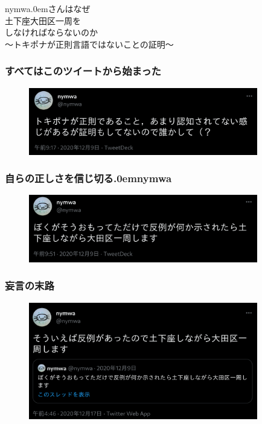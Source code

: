 \documentclass[14pt]{beamer}
\theoremstyle{definition}
\begin{document}
\begin{frame}
	\begin{center}
		{\LARGE \color{cyan} nymwa\kern.0emさんはなぜ\\土下座大田区一周を\\しなければならないのか} \\
		\vspace{1em}
		{\scriptsize 〜トキポナが正則言語ではないことの証明〜}
	\end{center}
\end{frame}


\begin{frame}
	\frametitle{すべてはこのツイートから始まった}

	\begin{figure}[h]
		\centering
		\includegraphics[width=10cm]{tweet1.png}
	\end{figure}

\end{frame}


\begin{frame}
	\frametitle{自らの正しさを信じ切る\kern.0emnymwa}

	\begin{figure}[h]
		\centering
		\includegraphics[width=10cm]{tweet2.png}
	\end{figure}

\end{frame}


\begin{frame}
	\frametitle{妄言の末路}

	\begin{figure}[h]
		\centering
		\includegraphics[width=10cm]{tweet3.png}
	\end{figure}

\end{frame}
\end{document}
